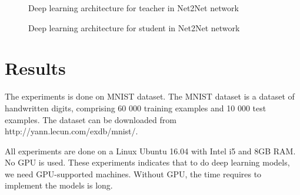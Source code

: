 \documentclass{svproc}
\begin{document}
\begin{figure}
\caption{Deep learning architecture for teacher in Net2Net network}
\label{fig:3}       %
\end{figure}

\begin{figure}
\caption{Deep learning architecture for student in Net2Net network}
\label{fig:4}       %
\end{figure}

\section{Results}

The experiments is done on MNIST dataset\cite{lecun-mnisthandwrittendigit-2010}. The MNIST dataset is a dataset of handwritten digits, comprising 60 000 training examples and 10 000 test examples. The dataset can be downloaded from http://yann.lecun.com/exdb/mnist/. 

All experiments are done on a Linux Ubuntu 16.04 with Intel i5 and 8GB RAM. No GPU is used. These experiments indicates that to do deep learning models, we need GPU-supported machines. Without GPU, the time requires to implement the models is long.
\end{document}
